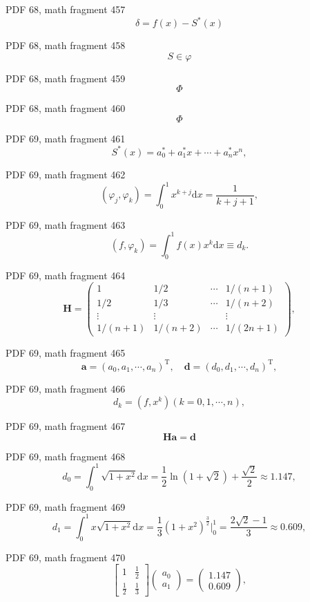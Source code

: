 \documentclass[UTF8,fontset=fandol]{ctexart}
\begin{document}
PDF 68, math fragment 457
\[\delta = f(x) - S^*(x)\]
\par
PDF 68, math fragment 458
\[S\in\varphi\]
\par
PDF 68, math fragment 459
\[\Phi\]
\par
PDF 68, math fragment 460
\[\Phi\]
\par
PDF 69, math fragment 461
\[
S^*(x) = a_0^* + a_1^* x + \cdots + a_n^* x^n,
\]
\par
PDF 69, math fragment 462
\[
(\varphi_j, \varphi_k) = \int_0^1 x^{k+j} \mathrm{d}x = \frac{1}{k+j+1},
\]
\par
PDF 69, math fragment 463
\[
(f, \varphi_k) = \int_0^1 f(x) x^k \mathrm{d}x \equiv d_k.
\]
\par
PDF 69, math fragment 464
\[\boldsymbol{H} = \begin{pmatrix}
1 & 1/2 & \cdots & 1/(n+1) \\
1/2 & 1/3 & \cdots & 1/(n+2) \\
\vdots & \vdots & & \vdots \\
1/(n+1) & 1/(n+2) & \cdots & 1/(2n+1)
\end{pmatrix}, \tag{3.3.16}
\]
\par
PDF 69, math fragment 465
\[
\boldsymbol{a} = (a_0, a_1, \cdots, a_n)^{\mathrm{T}}, \quad \boldsymbol{d} = (d_0, d_1, \cdots, d_n)^{\mathrm{T}},
\]
\par
PDF 69, math fragment 466
\[
d_k = (f, x^k) (k=0, 1, \cdots, n), \tag{3.3.17}
\]
\par
PDF 69, math fragment 467
\[\boldsymbol{H}\boldsymbol{a}=\boldsymbol{d}
\]
\par
PDF 69, math fragment 468
\[
d_0 = \int_0^1 \sqrt{1+x^2} \mathrm{d}x = \frac{1}{2} \ln(1+\sqrt{2}) + \frac{\sqrt{2}}{2} \approx 1.147,
\]
\par
PDF 69, math fragment 469
\[
d_1 = \int_0^1 x \sqrt{1+x^2} \mathrm{d}x = \frac{1}{3} (1+x^2)^{\frac{3}{2}} \Bigg|_0^1 = \frac{2\sqrt{2}-1}{3} \approx 0.609,
\]
\par
PDF 69, math fragment 470
\[
\begin{bmatrix}
1 & \frac{1}{2} \\
\frac{1}{2} & \frac{1}{3}
\end{bmatrix} \begin{pmatrix} a_0 \\ a_1 \end{pmatrix} = \begin{pmatrix} 1.147 \\ 0.609 \end{pmatrix},
\]
\end{document}
